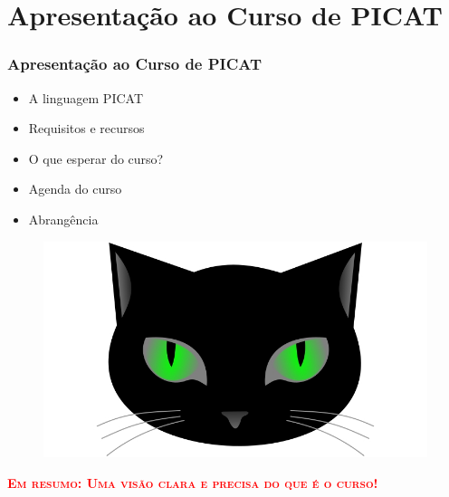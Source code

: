 \section{Apresentação ao Curso de PICAT}


\begin{frame}[fragile]
\frametitle{Apresentação ao Curso de PICAT}
\begin{minipage}{0.47\textwidth}
    \begin{itemize}
        \item A linguagem PICAT   
        \item Requisitos e recursos
        \item O que esperar do curso?
        \item Agenda do curso
        \item Abrangência

    \end{itemize}
\end{minipage}
\begin{minipage}{0.5\textwidth}
\begin{figure}[ht!]
\begin{center}
\includegraphics[width=1.2\textwidth, height=0.40\textheight]{figures/logo_picat_alex.jpg}
\end{center}
\end{figure}
\end{minipage}

\pause
\begin{center}
\textcolor{red}{\textbf{\textsc{Em resumo: Uma visão clara e precisa do que é o curso!}}}
 \end{center}


\end{frame}


